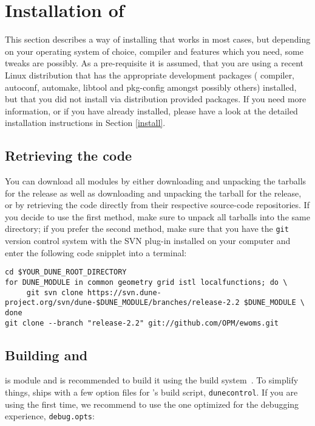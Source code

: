 \section{Installation of \eWoms} \label{quick-install}

This section describes a way of installing \eWoms that works in most
cases, but depending on your operating system of choice, \Cplusplus
compiler and features which you need, some tweaks are possibly. As a
pre-requisite it is assumed, that you are using a recent Linux
distribution that has the appropriate development packages (\Cplusplus
compiler, autoconf, automake, libtool and pkg-config amongst possibly
others) installed, but that you did not install \Dune via distribution
provided packages.  If you need more information, or if you have \Dune
already installed, please have a look at the detailed installation
instructions in Section \ref{install}.

\subsection{Retrieving the code}


You can download all \Dune modules by either downloading and unpacking
the tarballs for the  release as well as downloading and
unpacking the tarball for the  release, or by retrieving the
code directly from their respective source-code repositories. If you
decide to use the first method, make sure to unpack all tarballs into
the same directory; if you prefer the second method, make sure that
you have the \texttt{git} version control system with the SVN plug-in
installed on your computer and enter the following code snipplet into
a terminal:
\begin{lstlisting}[style=Bash]
cd $YOUR_DUNE_ROOT_DIRECTORY
for DUNE_MODULE in common geometry grid istl localfunctions; do \
     git svn clone https://svn.dune-project.org/svn/dune-$DUNE_MODULE/branches/release-2.2 $DUNE_MODULE \
done
git clone --branch "release-2.2" git://github.com/OPM/ewoms.git
\end{lstlisting}

\subsection{Building \Dune and \eWoms}
\label{buildIt}

\eWoms is \Dune module and is recommended to build it using the \Dune
build system~\cite{DUNE-BS}. To simplify things, \eWoms ships with a
few option files for \Dune's build script, \texttt{dunecontrol}. If
you are using \eWoms the first time, we recommend to use the one
optimized for the debugging experience, \texttt{debug.opts}:

